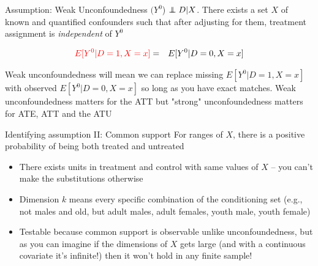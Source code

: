 \documentclass{beamer}
\newcommand\independent{\protect\mathpalette{\protect\independenT}{\perp}}
\def\independenT#1#2{\mathrel{\rlap{$#1#2$}\mkern2mu{#1#2}}}
\begin{document}
\begin{frame}[plain]

	\begin{block}{Assumption: Weak Unconfoundedness}
	$(Y^0$) $\independent{D} | X$. There exists a set $X$ of known and quantified confounders such that after adjusting for them, treatment assignment is \emph{independent} of $Y^0$
	\end{block}
	
	\begin{eqnarray*}
	\textcolor{red}{E[Y^0 | D=1, X=x]} &=& E[Y^0 | D=0, X=x] \\
	\end{eqnarray*}
	
Weak unconfoundedness will mean we can replace missing $E[Y^0|D=1,X=x]$ with observed $E[Y^0|D=0, X=x]$ so long as you have exact matches.  Weak unconfoundedness matters for the ATT but "strong" unconfoundedness matters for ATE, ATT and the ATU
	
	
\end{frame}



\begin{frame}[plain]

	\begin{block}{Identifying assumption II: Common support}
	For ranges of $X$, there is a positive probability of being both treated and untreated
	\end{block}
	
	\begin{itemize}
	\item There exists units in treatment and control with same values of $X$ -- you can't make the substitutions otherwise
	\item Dimension $k$ means every specific combination of the conditioning set (e.g., not males and old, but adult males, adult females, youth male, youth female)
	\item Testable because common support is observable unlike unconfoundedness, but as you can imagine if the dimensions of $X$ gets large (and with a continuous covariate it's infinite!) then it won't hold in any finite sample!
	\end{itemize}
	
	
\end{frame}
\end{document}
